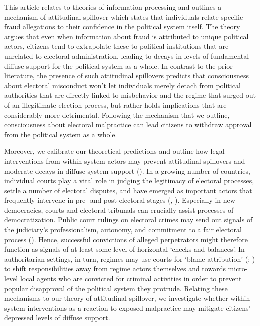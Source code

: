 \documentclass[11pt, ngerman,english,a4]{article}
\begin{document}
This article relates to theories of information processing and outlines a mechanism of attitudinal spillover which states that individuals relate specific fraud allegations to their confidence in the political system itself. The theory argues that even when information about fraud is attributed to unique political actors, citizens tend to extrapolate these to political institutions that are unrelated to electoral administration, leading to decays in levels of fundamental diffuse support for the political system as a whole. In contrast to the prior literature, the presence of such attitudinal spillovers predicts that consciousness about electoral misconduct won’t let individuals merely detach from political authorities that are directly linked to misbehavior and the regime that surged out of an illegitimate election process, but rather holds implications that are considerably more detrimental. Following the mechanism that we outline, consciousness about electoral malpractice can lead citizens to withdraw approval from the political system as a whole.

Moreover, we calibrate our theoretical predictions and outline how legal interventions from within-system actors may prevent attitudinal spillovers and moderate decays in diffuse system support (\citealt{Easton1965, Easton1975}). In a growing number of countries, individual courts play a vital role in judging the legitimacy of electoral processes, settle a number of electoral disputes, and have emerged as important actors that frequently intervene in pre- and post-electoral stages (\citealt{Eisenstadt2002}, \citealt{Kerr2020}). Especially in new democracies, courts and electoral tribunals can crucially assist processes of democratization. Public court rulings on electoral crimes may send out signals of the judiciary's professionalism, autonomy, and commitment to a fair electoral process  (\citealt{Kerr2020}). Hence, successful convictions of alleged perpetrators might therefore function as signals of at least some level of horizontal `checks and balances'. In authoritarian settings, in turn, regimes may use courts for `blame attribution' (\citealt{Beazer2019}; \citealt{Rozenas2019b}) to shift responsibilities away from regime actors themselves and towards micro-level local agents who are convicted for criminal activities in order to prevent popular disapproval of the political system they protrude. Relating these mechanisms to our theory of attitudinal spillover, we investigate whether within-system interventions as a reaction to exposed malpractice may mitigate citizens' depressed levels of diffuse support.
\end{document}
